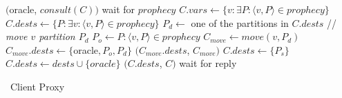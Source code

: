 \begin{algorithm}[h!]
\small

\begin{distribalgo}[1]

\vspace{1.25mm}


\vspace{1.0mm}

        \STATE \amcast$($oracle, $consult(C))$
        \STATE wait for $prophecy$
        \STATE $C.vars \leftarrow \{v: \exists P : \langle v, P \rangle \in prophecy \}$
        \STATE $C.dests \leftarrow \{P: \exists v : \langle v, P \rangle \in prophecy \}$
            \STATE $P_d \leftarrow$ one of the partitions in $C.dests$
                \STATE // \textit{move $v$ partition $P_d$}
                \STATE $P_o \leftarrow P : \langle v, P \rangle \in prophecy$
                    \STATE $C_{move} \leftarrow move(v,P_d)$
                    \STATE $C_{move}.dests \leftarrow \{$oracle$,P_o,P_d\}$
                    \STATE \amcast$(C_{move}.dests$, $C_{move})$
                \ENDIF
            \ENDFOR
            \STATE $C.dests \leftarrow \{ P_s \}$
        \ENDIF
            \STATE $C.dests \leftarrow dests \cup \{oracle\}$
        \ENDIF
        \STATE \amcast$(C.dests$, $C)$
        \STATE wait for reply
    \ENDINDENT
\ENDINDENT

\caption{\dssmr\ Client Proxy}
\label{alg:client_proxy}
\end{distribalgo}
\end{algorithm}